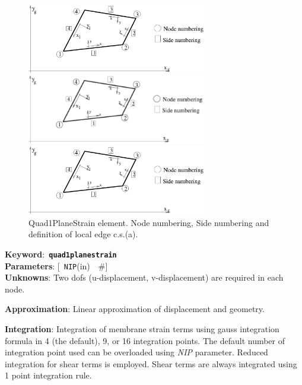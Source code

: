 \documentclass[a4paper]{article}
\newcommand{\descitem}[1]{{\noindent \bf #1}:}
\newcommand{\elemkeyword}[1]{\descitem{Keyword}~{\bf \texttt{#1}}}
\newcommand{\elemparam}[2]{{{\texttt{#1}\tiny (#2)}~~\#}}
\newcommand{\optelemparam}[2]{{[~\elemparam{#1}{#2}]}}
\newcommand{\param}[1]{{\em #1}}
\begin{document}
\begin{figure}[tb]
\begin{htmlonly}
  \centerline{\includegraphics[width=0.7\textwidth]{planestress2d.eps}}
\end{htmlonly}
\ifpdf
\centerline{\includegraphics[width=0.7\textwidth]{planestress2d.pdf}}
\else
\centerline{\includegraphics[width=0.7\textwidth]{planestress2d.eps}}
\fi
\caption{Quad1PlaneStrain element. Node numbering, Side numbering and
definition of local edge c.s.(a).}
\label{Quad1PlaneStrainfig}
\end{figure}

\elemkeyword{quad1planestrain}\\
\descitem{Parameters} \optelemparam{NIP}{in}\\
\descitem{Unknowns}
Two dofs (u-displacement, v-displacement) are required in each node.

\descitem{Approximation} Linear approximation of displacement and
geometry.

\descitem{Integration}
Integration of membrane strain terms using gauss integration formula
in 4 (the default), 9, or 16 integration points. The default number of
integration point used can be overloaded using \param{NIP} parameter.
Reduced integration for shear terms is employed. Shear terms are
always integrated using 1 point integration rule.
\end{document}
